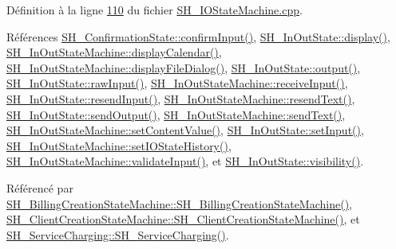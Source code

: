 Définition à la ligne \hyperlink{SH__IOStateMachine_8cpp_source_l00110}{110} du fichier \hyperlink{SH__IOStateMachine_8cpp_source}{S\-H\-\_\-\-I\-O\-State\-Machine.\-cpp}.



Références \hyperlink{classSH__ConfirmationState_ae47d89a7fc0ada8eb51d8bef2317b348}{S\-H\-\_\-\-Confirmation\-State\-::confirm\-Input()}, \hyperlink{classSH__InOutState_a918e8a7f5fe00dc16004e46eeee1281d}{S\-H\-\_\-\-In\-Out\-State\-::display()}, \hyperlink{classSH__InOutStateMachine_a0d241868828cbf9798233a8c74c69851}{S\-H\-\_\-\-In\-Out\-State\-Machine\-::display\-Calendar()}, \hyperlink{classSH__InOutStateMachine_aeddfbc098f5ee8ac05eadbaf37803fb1}{S\-H\-\_\-\-In\-Out\-State\-Machine\-::display\-File\-Dialog()}, \hyperlink{classSH__InOutState_a1a2fd4f34484125058e20730aaee7e46}{S\-H\-\_\-\-In\-Out\-State\-::output()}, \hyperlink{classSH__InOutState_a4b1ca094de91c47690ec2d1e95678273}{S\-H\-\_\-\-In\-Out\-State\-::raw\-Input()}, \hyperlink{classSH__InOutStateMachine_ab224e4a6ab99c15770bc63e1b8fdb771}{S\-H\-\_\-\-In\-Out\-State\-Machine\-::receive\-Input()}, \hyperlink{classSH__InOutState_afa791181eb61a18d4337a04827f9b200}{S\-H\-\_\-\-In\-Out\-State\-::resend\-Input()}, \hyperlink{classSH__InOutStateMachine_a526822c66b46aa0cd81ba4473fa5573f}{S\-H\-\_\-\-In\-Out\-State\-Machine\-::resend\-Text()}, \hyperlink{classSH__InOutState_ad40e929a5537eb1d4883d5aa6eee5b15}{S\-H\-\_\-\-In\-Out\-State\-::send\-Output()}, \hyperlink{classSH__InOutStateMachine_ae2cbbe3cd207158668dcb4838938c7ad}{S\-H\-\_\-\-In\-Out\-State\-Machine\-::send\-Text()}, \hyperlink{classSH__InOutStateMachine_aa2766b7a7ba39c35a10df7fc0c151b4f}{S\-H\-\_\-\-In\-Out\-State\-Machine\-::set\-Content\-Value()}, \hyperlink{classSH__InOutState_a0206ab7d5616f28b0da7bfd5451614e8}{S\-H\-\_\-\-In\-Out\-State\-::set\-Input()}, \hyperlink{classSH__InOutStateMachine_a4b72e6da839782a211692a4d728c3925}{S\-H\-\_\-\-In\-Out\-State\-Machine\-::set\-I\-O\-State\-History()}, \hyperlink{classSH__InOutStateMachine_a5a5804bd32a04d25926f6e323b906887}{S\-H\-\_\-\-In\-Out\-State\-Machine\-::validate\-Input()}, et \hyperlink{classSH__InOutState_a8c496b2fe21a51a587c6e4409c0f37ec}{S\-H\-\_\-\-In\-Out\-State\-::visibility()}.



Référencé par \hyperlink{classSH__BillingCreationStateMachine_ad62b77fa4aeafe200056ff3974562f83}{S\-H\-\_\-\-Billing\-Creation\-State\-Machine\-::\-S\-H\-\_\-\-Billing\-Creation\-State\-Machine()}, \hyperlink{classSH__ClientCreationStateMachine_a0b406b0f404c0fd33bf35be8ce0cc811}{S\-H\-\_\-\-Client\-Creation\-State\-Machine\-::\-S\-H\-\_\-\-Client\-Creation\-State\-Machine()}, et \hyperlink{classSH__ServiceCharging_afa5273d046049b1c2b020a6a19a8290b}{S\-H\-\_\-\-Service\-Charging\-::\-S\-H\-\_\-\-Service\-Charging()}.


